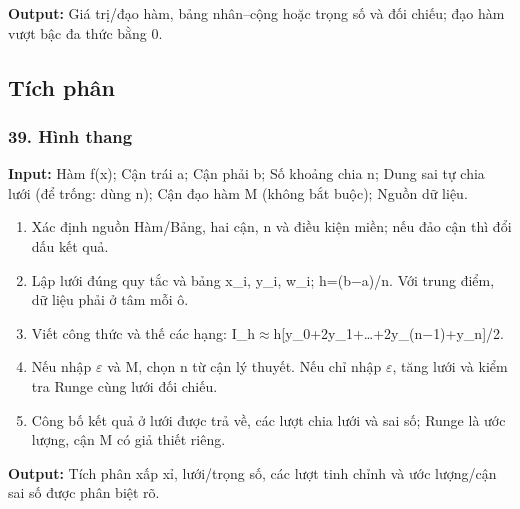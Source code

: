 \textbf{Output:} Giá trị/\allowbreak{}đạo hàm,\allowbreak{} bảng nhân–cộng hoặc trọng số và đối chiếu;\allowbreak{} đạo hàm vượt bậc đa thức bằng 0.

\subsection{Tích phân}

\examplebreak\subsubsection*{39. Hình thang}

\textbf{Input:} Hàm f(\allowbreak{}x);\allowbreak{} Cận trái a;\allowbreak{} Cận phải b;\allowbreak{} Số khoảng chia n;\allowbreak{} Dung sai tự chia lưới (\allowbreak{}để trống: dùng n);\allowbreak{} Cận đạo hàm M (\allowbreak{}không bắt buộc);\allowbreak{} Nguồn dữ liệu.

\begin{enumerate}

\item Xác định nguồn Hàm/\allowbreak{}Bảng,\allowbreak{} hai cận,\allowbreak{} n và điều kiện miền;\allowbreak{} nếu đảo cận thì đổi dấu kết quả.

\item Lập lưới đúng quy tắc và bảng x\_i,\allowbreak{} y\_i,\allowbreak{} w\_i;\allowbreak{} h=\allowbreak{}(\allowbreak{}b\ensuremath{-}a)/\allowbreak{}n. Với trung điểm,\allowbreak{} dữ liệu phải ở tâm mỗi ô.

\item Viết công thức và thế các hạng: I\_h\ensuremath{\approx}h[y\_0+\allowbreak{}2y\_1+\allowbreak{}…+\allowbreak{}2y\_(\allowbreak{}n\ensuremath{-}1)+\allowbreak{}y\_n]/\allowbreak{}2.

\item Nếu nhập \ensuremath{\varepsilon} và M,\allowbreak{} chọn n từ cận lý thuyết. Nếu chỉ nhập \ensuremath{\varepsilon},\allowbreak{} tăng lưới và kiểm tra Runge cùng lưới đối chiếu.

\item Công bố kết quả ở lưới được trả về,\allowbreak{} các lượt chia lưới và sai số;\allowbreak{} Runge là ước lượng,\allowbreak{} cận M có giả thiết riêng.

\end{enumerate}

\textbf{Output:} Tích phân xấp xỉ,\allowbreak{} lưới/\allowbreak{}trọng số,\allowbreak{} các lượt tinh chỉnh và ước lượng/\allowbreak{}cận sai số được phân biệt rõ.

